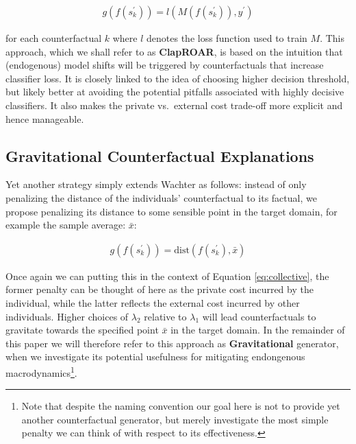 \documentclass[conference,final,]{IEEEtran}
\begin{document}
\begin{equation}
\begin{aligned}
g(f(s_k^\prime)) = l(M(f(s_k^\prime)),y^\prime) \label{eq:clap}
\end{aligned}
\end{equation}

for each counterfactual \(k\) where \(l\) denotes the loss function used to train \(M\). This approach, which we shall refer to as \textbf{ClapROAR}, is based on the intuition that (endogenous) model shifts will be triggered by counterfactuals that increase classifier loss. It is closely linked to the idea of choosing higher decision threshold, but likely better at avoiding the potential pitfalls associated with highly decisive classifiers. It also makes the private vs.~external cost trade-off more explicit and hence manageable.

\hypertarget{gravitational-counterfactual-explanations}{%
\subsection{Gravitational Counterfactual Explanations}\label{gravitational-counterfactual-explanations}}

Yet another strategy simply extends Wachter as follows: instead of only penalizing the distance of the individuals' counterfactual to its factual, we propose penalizing its distance to some sensible point in the target domain, for example the sample average: \(\bar{x}\):

\begin{equation}
\begin{aligned}
g(f(s_k^\prime)) = \text{dist}(f(s_k^\prime),\bar{x})  \label{eq:grav}
\end{aligned}
\end{equation}

Once again we can putting this in the context of Equation \eqref{eq:collective}, the former penalty can be thought of here as the private cost incurred by the individual, while the latter reflects the external cost incurred by other individuals. Higher choices of \(\lambda_2\) relative to \(\lambda_1\) will lead counterfactuals to gravitate towards the specified point \(\bar{x}\) in the target domain. In the remainder of this paper we will therefore refer to this approach as \textbf{Gravitational} generator, when we investigate its potential usefulness for mitigating endongenous macrodynamics\footnote{Note that despite the naming convention our goal here is not to provide yet another counterfactual generator, but merely investigate the most simple penalty we can think of with respect to its effectiveness.}.
\end{document}
